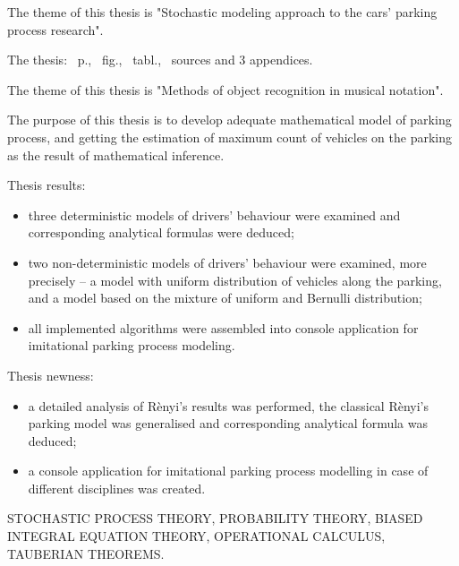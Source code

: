 
The theme of this thesis is "Stochastic modeling approach to the cars' parking process research".

The thesis: \pageref*{MyLastPage}~p., \totfig~fig., \tottab~tabl., ~sources and 3 appendices.

The theme of this thesis is "Methods of object recognition in musical notation".

The purpose of this thesis is to develop adequate mathematical model of parking process, and getting the estimation of maximum count of vehicles on the parking as the result of mathematical inference.

Thesis results:
\begin{itemize}
	\item three deterministic models of drivers' behaviour were examined and corresponding analytical formulas were deduced;
	\item two non-deterministic models of drivers' behaviour were examined, more precisely – a model with uniform distribution of vehicles along the parking, and a model based on the mixture of uniform and Bernulli distribution;
	\item all implemented algorithms were assembled into console application for imitational parking process modeling.
\end{itemize}

Thesis newness:
\begin{itemize}
	\item a detailed analysis of Rènyi's results was performed, the classical Rènyi's parking model was generalised and corresponding analytical formula was deduced;
	\item a console application for imitational parking process modelling in case of different disciplines was created.  
\end{itemize}

\MakeUppercase{stochastic process theory, probability theory, biased integral equation theory, operational calculus, tauberian theorems.}